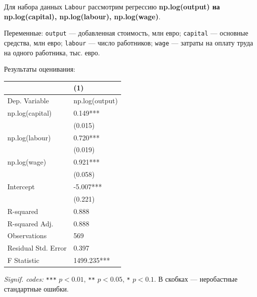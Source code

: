 \documentclass[
  russian,
]{article}
\newcounter{none} %
\begin{document}
Для набора данных \texttt{Labour} рассмотрим регрессию
\textbf{np.log(output) на np.log(capital), np.log(labour),
np.log(wage)}.

Переменные: \texttt{output} --- добавленная стоимость, млн евро;
\texttt{capital} --- основные средства, млн евро; \texttt{labour} ---
число работников; \texttt{wage} --- затраты на оплату труда на одного
работника, тыс. евро.

Результаты оценивания:

{\def\LTcaptype{none} %
\begin{longtable}[]{@{}ll@{}}
\toprule\noalign{}
& (1) \\
\midrule\noalign{}
\endhead
\bottomrule\noalign{}
\endlastfoot
Dep. Variable & np.log(output) \\
np.log(capital) & 0.149*** \\
& (0.015) \\
np.log(labour) & 0.720*** \\
& (0.019) \\
np.log(wage) & 0.921*** \\
& (0.058) \\
Intercept & -5.007*** \\
& (0.221) \\
R-squared & 0.888 \\
R-squared Adj. & 0.888 \\
Observations & 569 \\
Residual Std. Error & 0.397 \\
F Statistic & 1499.235*** \\
\end{longtable}
}

\emph{Signif. codes:} \texttt{***} \(p<0.01\), \texttt{**} \(p<0.05\),
\texttt{*} \(p<0.1\). В скобках --- неробастные стандартные ошибки.
\end{document}
